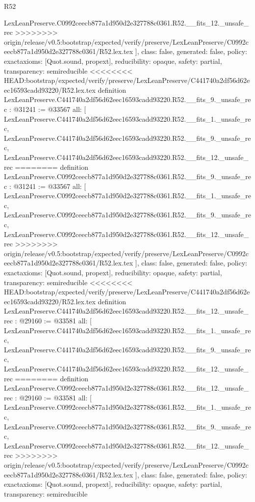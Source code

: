 \begin{lexlean}{R52}
\begin{coremodule}
{{{{{{{{{{{{{{{{{{{{{{{{{{{{{{{{{{{{{{{{{{{{{{{{{{{{{{{{{{{{{{{{{{{{{{{{{{{{{{{{{{{{{{{{{{{{{{{{{{{{{{{{{{{{{{{{{{{{{{{{{{{{{{{{{{{{{{{{{{{{{{{{{{{{{{{{{{{{    LexLeanPreserve.C0992ceecb877a1d950d2e327788c0361.R52.__fits_12._unsafe_rec
>>>>>>>> origin/release/v0.5:bootstrap/expected/verify/preserve/LexLeanPreserve/C0992ceecb877a1d950d2e327788c0361/R52.lex.tex
  ],
  class: false,
  generated: false,
  policy: exact{axioms: [Quot.sound, propext]},
  reducibility: opaque{},
  safety: partial,
  transparency: semireducible
}
<<<<<<<< HEAD:bootstrap/expected/verify/preserve/LexLeanPreserve/C441740a2df56d62eec16593cadd93220/R52.lex.tex
definition LexLeanPreserve.C441740a2df56d62eec16593cadd93220.R52.__fits_9._unsafe_rec : @31241 := @33567 {
  all: [
    LexLeanPreserve.C441740a2df56d62eec16593cadd93220.R52.__fits_1._unsafe_rec,
    LexLeanPreserve.C441740a2df56d62eec16593cadd93220.R52.__fits_9._unsafe_rec,
    LexLeanPreserve.C441740a2df56d62eec16593cadd93220.R52.__fits_12._unsafe_rec
========
definition LexLeanPreserve.C0992ceecb877a1d950d2e327788c0361.R52.__fits_9._unsafe_rec : @31241 := @33567 {
  all: [
    LexLeanPreserve.C0992ceecb877a1d950d2e327788c0361.R52.__fits_1._unsafe_rec,
    LexLeanPreserve.C0992ceecb877a1d950d2e327788c0361.R52.__fits_9._unsafe_rec,
    LexLeanPreserve.C0992ceecb877a1d950d2e327788c0361.R52.__fits_12._unsafe_rec
>>>>>>>> origin/release/v0.5:bootstrap/expected/verify/preserve/LexLeanPreserve/C0992ceecb877a1d950d2e327788c0361/R52.lex.tex
  ],
  class: false,
  generated: false,
  policy: exact{axioms: [Quot.sound, propext]},
  reducibility: opaque{},
  safety: partial,
  transparency: semireducible
}
<<<<<<<< HEAD:bootstrap/expected/verify/preserve/LexLeanPreserve/C441740a2df56d62eec16593cadd93220/R52.lex.tex
definition LexLeanPreserve.C441740a2df56d62eec16593cadd93220.R52.__fits_12._unsafe_rec : @29160 := @33581 {
  all: [
    LexLeanPreserve.C441740a2df56d62eec16593cadd93220.R52.__fits_1._unsafe_rec,
    LexLeanPreserve.C441740a2df56d62eec16593cadd93220.R52.__fits_9._unsafe_rec,
    LexLeanPreserve.C441740a2df56d62eec16593cadd93220.R52.__fits_12._unsafe_rec
========
definition LexLeanPreserve.C0992ceecb877a1d950d2e327788c0361.R52.__fits_12._unsafe_rec : @29160 := @33581 {
  all: [
    LexLeanPreserve.C0992ceecb877a1d950d2e327788c0361.R52.__fits_1._unsafe_rec,
    LexLeanPreserve.C0992ceecb877a1d950d2e327788c0361.R52.__fits_9._unsafe_rec,
    LexLeanPreserve.C0992ceecb877a1d950d2e327788c0361.R52.__fits_12._unsafe_rec
>>>>>>>> origin/release/v0.5:bootstrap/expected/verify/preserve/LexLeanPreserve/C0992ceecb877a1d950d2e327788c0361/R52.lex.tex
  ],
  class: false,
  generated: false,
  policy: exact{axioms: [Quot.sound, propext]},
  reducibility: opaque{},
  safety: partial,
  transparency: semireducible
}}}}}}}}}}}}}}}}}}}}}}}}}}}}}}}}}}}}}}}}}}}}}}}}}}}}}}}}}}}}}}}}}}}}}}}}}}}}}}}}}}}}}}}}}}}}}}}}}}}}}}}}}}}}}}}}}}}}}}}}}}}}}}}}}}}}}}}}}}}}}}}}}}}}}}}}}}}}}}
\end{coremodule}
\end{lexlean}
